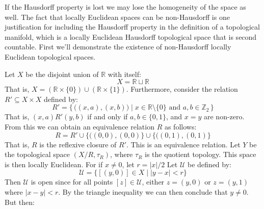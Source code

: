 \documentclass{article}                                                        %
\begin{document}
        If the Hausdorff property is lost we may lose the homogeneity of the
        space as well. The fact that locally Euclidean spaces can be
        non-Hausdorff is one justification for including the Hausdorff
        property in the definition of a topological manifold, which is a
        locally Euclidean Hausdorff topological space that is second
        countable. First we'll demonstrate the existence of non-Hausdorff
        locally Euclidean topological spaces.
        \begin{example}
                Let $X$ be the disjoint union of $\mathbb{R}$ with itself:
                \begin{equation}
                    X=\mathbb{R}\sqcup\mathbb{R}
                \end{equation}
                That is, $X=(\mathbb{R}\times\{0\})\cup(\mathbb{R}\times\{1\})$.
                Furthermore, consider the relation $R'\subseteq{X}\times{X}$
                defined by:
                \begin{equation}
                    R'=\Big\{\,\Big((x,a),(x,b)\Big)\;\Big|\;
                        x\in\mathbb{R}\setminus\{0\}
                        \textrm{ and }a,b\in\mathbb{Z}_{2}\,\Big\}
                \end{equation}
                That is, $(x,a)R'(y,b)$ if and only if $a,b\in\{0,1\}$, and
                $x=y$ are non-zero. From this we can obtain an equivalence
                relation $R$ as follows:
                \begin{equation}
                    R=R'\cup\big\{\big((0,0),(0,0)\big\}\cup
                        \big\{\big((0,1),(0,1)\big\}
                \end{equation}
                That is, $R$ is the reflexive closure of $R'$. This is an
                equivalence relation. Let $Y$ be the topological space
                $(X/R,\tau_{R})$, where $\tau_{R}$ is the quotient topology.
                This space is then locally Euclidean. For if $x\ne{0}$, let
                $r=|x|/2$ Let $\mathcal{U}$ be defined by:
                \begin{equation}
                    \mathcal{U}=\big\{[(y,0)]\in{X}\;|\;|y-x|<r\big\}
                \end{equation}
                Then $\mathcal{U}$ is open since for all points
                $[z]\in\mathcal{U}$, either $z=(y,0)$ or $z=(y,1)$ where
                $|x-y|<r$. By the triangle inequality we can then conclude that
                $y\ne{0}$. But then:
                \begin{equation}

\end{equation}
\end{example}
\end{document}
